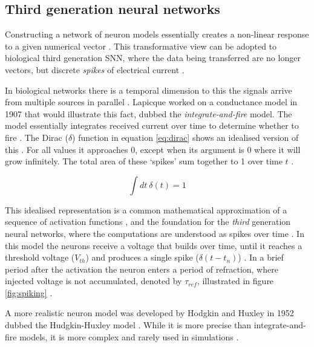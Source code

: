 \documentclass[report.tex]{subfiles}
\begin{document}
\subsection{Third generation neural networks}
Constructing a network of neuron models essentially creates a non-linear
response to a given numerical vector \cite{Russel2007}.
This transformative view can be adopted to biological third generation 
\gls{SNN}, where the data being transferred are no longer vectors, but discrete
\textit{spikes} of electrical current \cite[p. 32]{Dayan2001, Eliasmith2004}.

In biological networks there is a temporal dimension to this the signals
arrive from multiple sources in parallel \cite{Eliasmith2004}.
Lapicque worked on a conductance model in 1907 that would illustrate this fact,
dubbed the \textit{integrate-and-fire} 
model.
The model essentially integrates received current over time
to determine whether to fire
\cite{Dayan2001, Eliasmith2004}.
The Dirac ($\delta$) function 
in equation \ref{eq:dirac} shows an idealised
version of this \cite[p. 404]{Dayan2001}.
For all values it approaches 0, except when its argument is
0 where it will grow infinitely.
The total area of these `spikes' sum together to 1 over time $t$ .

\begin{equation} \label{eq:dirac}
\int dt\ \delta(t) = 1
\end{equation}

This idealised representation is a common mathematical approximation of
a sequence of activation functions \cite{Dayan2001, Eliasmith2004},
and the foundation for the \textit{third} generation
neural networks, where the computations are understood as spikes over
time \cite{Maass1997}.  
In this model the neurons receive a voltage that builds over time, until
it reaches a threshold voltage ($V_{th}$) and produces a single spike
\mbox{($\delta(t-t_n)$)}
\cite{Dayan2001, Eliasmith2004}.
In a brief period after the activation the neuron enters a period of
refraction, 
where injected voltage is not accumulated, denoted by 
$\tau_{ref}$, illustrated in figure \ref{fig:spiking}
\cite[p. 82]{Eliasmith2004}.

A more realistic neuron model was developed by Hodgkin
and Huxley in 1952 dubbed the Hudgkin-Huxley model \cite{Dayan2001}.
While it is more precise than integrate-and-fire models, it is
more complex \cite[p. 195]{Dayan2001} and rarely used in simulations
\cite{Albada2018, Dayan2001, Eliasmith2015}.
\end{document}
